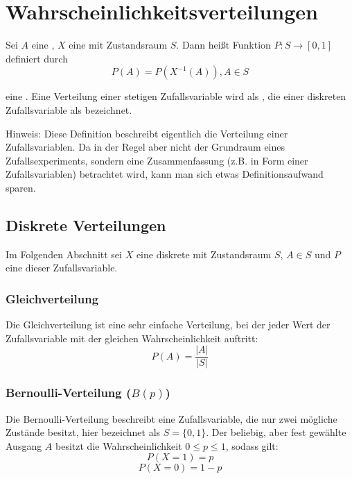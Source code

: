 \chapter{Wahrscheinlichkeitsverteilungen}

\begin{definition}[Wahrscheinlichkeitsverteilung]\label{def:verteilung}
Sei $A$ eine , $X$ eine 
mit Zustandsraum $S$. Dann heißt Funktion $P: S \rightarrow [0,1]$ definiert
durch
\[P(A) = P(X^{-1}(A)), A \in S\]

eine . Eine Verteilung einer stetigen
Zufallsvariable wird als , die einer diskreten
Zufallsvariable als  bezeichnet.
\end{definition}

Hinweis: Diese Definition beschreibt eigentlich die Verteilung einer
Zufallsvariablen. Da in der Regel aber nicht der Grundraum eines
Zufallsexperiments, sondern eine Zusammenfassung (z.B. in Form einer
Zufallsvariablen) betrachtet wird, kann man sich etwas Definitionsaufwand
sparen.

\section{Diskrete Verteilungen}

Im Folgenden Abschnitt sei $X$ eine diskrete 
mit Zustandsraum $S$, $A \in S$ und $P$ eine
 dieser Zufallsvariable.


\subsection{Gleichverteilung}

Die Gleichverteilung ist eine sehr einfache Verteilung, bei der jeder Wert der
Zufallsvariable mit der gleichen Wahrscheinlichkeit auftritt:
\[P(A) = \frac{|A|}{|S|}\]


\subsection{Bernoulli-Verteilung ($B(p)$)}

Die Bernoulli-Verteilung beschreibt eine Zufallsvariable, die nur zwei mögliche
Zustände besitzt, hier bezeichnet als $S = \{0,1\}$. Der beliebig, aber fest
gewählte Ausgang $A$ besitzt die Wahrscheinlichkeit $0 \le p \le 1$, sodass
gilt:
\[P(X=1)=p\]
\[P(X=0)=1-p\]


